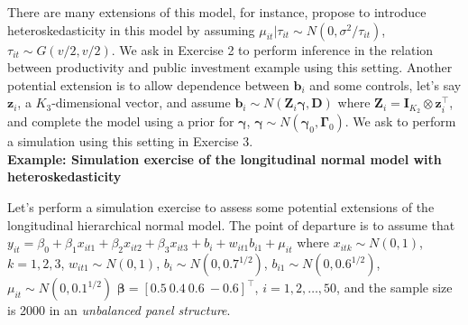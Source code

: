 There are many extensions of this model, for instance, \cite{Chib1999} propose to introduce heteroskedasticity in this model by assuming $\mu_{it}|\tau_{it}\sim N(0, \sigma^2/\tau_{it})$, $\tau_{it}\sim G(v/2,v/2)$. We ask in Exercise 2 to perform inference in the relation between productivity and public investment example using this setting. Another potential extension is to allow dependence between $\bm{b}_i$ and some controls, let's say $\bm{z}_i$, a $K_3$-dimensional vector, and assume $\bm{b}_i\sim N(\bm{Z}_i\bm{\gamma},\bm{D})$ where $\bm{Z}_i=\bm{I}_{K_2}\otimes \bm{z}_i^{\top}$, and complete the model using a prior for $\bm{\gamma}$, $\bm{\gamma}\sim N(\bm{\gamma}_0,\bm{\Gamma}_0)$. We ask to perform a simulation using this setting in Exercise 3.\\   

\textbf{Example: Simulation exercise of the longitudinal normal model with heteroskedasticity}

Let's perform a simulation exercise to assess some potential extensions of the longitudinal hierarchical normal model. The point of departure is to assume that $y_{it}=\beta_0+\beta_1x_{it1}+\beta_2x_{it2}+\beta_3x_{it3}+b_i+w_{it1}b_{i1}+\mu_{it}$ where $x_{itk}\sim N(0,1)$, $k=1,2,3$, $w_{it1}\sim N(0,1)$, $b_i\sim N(0, 0.7^{1/2})$, $b_{i1}\sim N(0, 0.6^{1/2})$, $\mu_{it}\sim N(0, 0.1^{1/2})$ $\bm{\beta}=[0.5 \ 0.4 \ 0.6 \ -0.6]^{\top}$, $i=1,2,\dots,50$, and the sample size is 2000 in an \textit{unbalanced panel structure}. 

